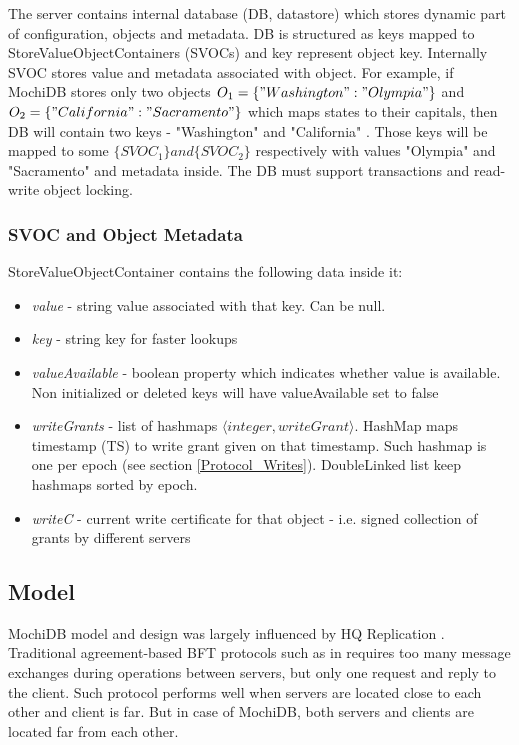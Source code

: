 \documentclass[letterpaper,twocolumn,10pt]{article}
\begin{document}
The server contains internal database (DB, datastore) which stores dynamic part of configuration, objects and metadata. DB is structured as keys mapped to StoreValueObjectContainers (SVOCs) and key represent object key. 
Internally SVOC stores value and metadata associated with object. For example, if MochiDB stores only two objects \(O_{1} = \{ "Washington":"Olympia" \} \) and \(O_{2} = \{ "California" : "Sacramento"\} \) which maps states to their capitals, then DB will contain two keys - {"Washington" and "California" }. Those keys will be mapped to some \( \{ SVOC_{1} \} and \{ SVOC_{2} \} \) respectively with values "Olympia" and "Sacramento" and metadata inside. The DB must support transactions and read-write object locking.

\subsubsection{SVOC and Object Metadata}
StoreValueObjectContainer contains the following data inside it:
\begin{itemize}[noitemsep, topsep=0pt,]
  \item \textit{value} - string value associated with that key. Can be null.
  \item  \textit{key} - string key for faster lookups
  \item  \textit{valueAvailable} - boolean property which indicates whether value is available. Non initialized or deleted keys will have valueAvailable set to false
  \item \textit{writeGrants} - list of hashmaps $\langle integer, writeGrant \rangle$. HashMap maps timestamp (TS) to write grant given on that timestamp. Such hashmap is one per epoch (see section \ref{Protocol_Writes}). DoubleLinked list keep hashmaps sorted by epoch.
  \item \textit{writeC} - current write certificate for that object - i.e. signed collection of grants by different servers
\end{itemize}

\subsection{Model}

MochiDB model and design was largely influenced by HQ Replication \cite{HQ_replication}. Traditional agreement-based BFT protocols such as in \cite{Practical_BFT} requires too many message exchanges during operations between servers, but only one request and reply to the client. Such protocol performs well when servers are located close to each other and client is far. But in case of MochiDB, both servers and clients are located far from each other.
\end{document}
